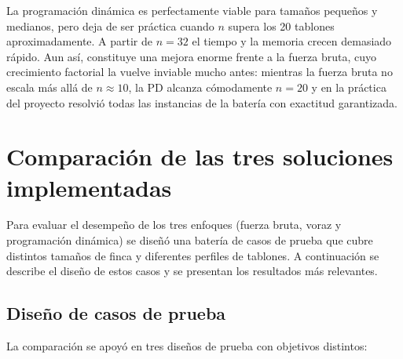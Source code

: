 \documentclass[12pt,a4paper]{article}
\begin{document}
La programaci\'on din\'amica es perfectamente viable para tama\~nos peque\~nos y medianos, pero deja de ser pr\'actica cuando \(n\) supera los 20 tablones aproximadamente. A partir de \(n=32\) el tiempo y la memoria crecen demasiado r\'apido. Aun as\'i, constituye una mejora enorme frente a la fuerza bruta, cuyo crecimiento factorial la vuelve inviable mucho antes: mientras la fuerza bruta no escala m\'as all\'a de \(n \approx 10\), la PD alcanza c\'omodamente \(n = 20\) y en la pr\'actica del proyecto resolvi\'o todas las instancias de la bater\'ia con exactitud garantizada.

\section{Comparaci\'on de las tres soluciones implementadas}

Para evaluar el desempe\~no de los tres enfoques (fuerza bruta, voraz y programaci\'on din\'amica) se dise\~n\'o una bater\'ia de casos de prueba que cubre distintos tama\~nos de finca y diferentes perfiles de tablones. A continuaci\'on se describe el dise\~no de estos casos y se presentan los resultados m\'as relevantes.

\subsection{Dise\~no de casos de prueba}

La comparaci\'on se apoy\'o en tres dise\~nos de prueba con objetivos distintos:
\end{document}
